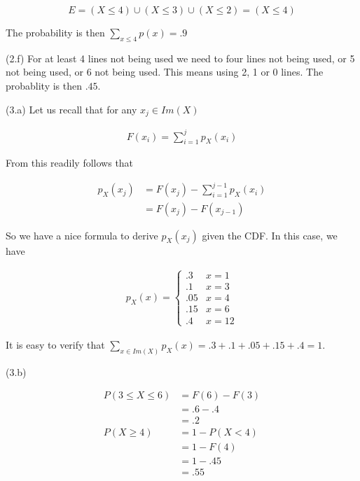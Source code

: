 \documentclass[a4paper, 12pt]{article}
\begin{document}
\begin{equation*}
    E = (X \leq 4) \cup (X \leq 3) \cup (X \leq 2) = (X \leq 4)
\end{equation*}

The probability is then $\sum_{x \leq 4} p(x) = .9$

(2.f) For at least 4 lines not being used we need to four lines not being used,
or 5 not being used, or 6 not being used. This means using 2, 1 or 0 lines. 
The probablity is then $.45$.

(3.a) Let us recall that for any $x_j \in Im(X)$

\begin{align*}
    F(x_i) = \sum_{i=1}^{j} p_X(x_i)
\end{align*}

From this readily follows that 

\begin{align*}
    p_X(x_j) &= F(x_j) - \sum_{i=1}^{j-1} p_X(x_i) \\ 
             &=F(x_j) - F(x_{j - 1})
\end{align*}

So we have a nice formula to derive $p_X(x_j)$ given the CDF. In this case, we have

\begin{align*}
    p_X(x) = \begin{cases}
        .3 & x = 1 \\ 
        .1 & x = 3 \\ 
        .05 & x = 4 \\ 
        .15 & x = 6 \\ 
        .4 & x = 12
    \end{cases}
\end{align*}

It is easy to verify that $\sum_{x \in Im(X)} p_X(x) = .3+.1+.05+.15+.4 = 1$.

(3.b) 

\begin{align*}
    P(3 \leq X \leq 6) &= F(6) - F(3) \\ 
                       &= .6 - .4 \\ 
                       &= .2 \\ 
    P(X \geq 4) &= 1 - P(X < 4) \\ 
                &=1 - F(4) \\ 
                &=1 - .45 \\ 
                &= .55
\end{align*}
\end{document}
